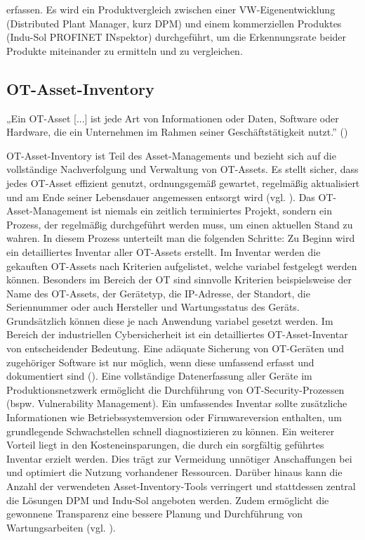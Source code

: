 erfassen. Es wird ein Produktvergleich zwischen einer VW-Eigenentwicklung (Distributed Plant Manager, kurz DPM) und einem kommerziellen Produktes (Indu-Sol PROFINET INspektor) durchgeführt, um die Erkennungsrate beider Produkte miteinander zu ermitteln und zu vergleichen. 



\subsection{OT-Asset-Inventory}

  „Ein OT-Asset [...] ist jede Art von Informationen oder Daten, Software oder Hardware, die ein Unternehmen im Rahmen seiner Geschäftstätigkeit nutzt.'' (\cite{IBM})

OT-Asset-Inventory ist Teil des Asset-Managements und bezieht sich auf die vollständige Nachverfolgung und Verwaltung von OT-Assets. Es stellt sicher, dass jedes OT-Asset effizient genutzt, ordnungsgemäß gewartet, regelmäßig aktualisiert und am Ende seiner Lebensdauer angemessen entsorgt wird (vgl. \cite{IBM}). Das OT-Asset-Management ist niemals ein zeitlich terminiertes Projekt, sondern ein Prozess, der regelmäßig durchgeführt werden muss, um einen aktuellen Stand zu wahren. In diesem Prozess unterteilt man die folgenden Schritte: Zu Beginn wird ein detailliertes Inventar aller OT-Assets erstellt. Im Inventar werden die gekauften OT-Assets nach Kriterien aufgelistet, welche variabel festgelegt werden können. Besonders im Bereich der OT sind sinnvolle Kriterien beispielsweise der Name des OT-Assets, der Gerätetyp, die IP-Adresse, der Standort, die Seriennummer oder auch Hersteller und Wartungsstatus des Geräts. Grundsätzlich können diese je nach Anwendung variabel gesetzt werden. Im Bereich der industriellen Cybersicherheit ist ein detailliertes OT-Asset-Inventar von entscheidender Bedeutung. Eine adäquate Sicherung von OT-Geräten und zugehöriger Software ist nur möglich, wenn diese umfassend erfasst und dokumentiert sind (\cite{atlassian}). Eine vollständige Datenerfassung aller Geräte im Produktionsnetzwerk ermöglicht die Durchführung von OT-Security-Prozessen (bspw. Vulnerability Management). Ein umfassendes Inventar sollte zusätzliche Informationen wie  Betriebssystemversion oder Firmwareversion enthalten, um grundlegende Schwachstellen schnell diagnostizieren zu können. Ein weiterer Vorteil liegt in den Kosteneinsparungen, die durch ein sorgfältig geführtes Inventar erzielt werden. Dies trägt zur Vermeidung unnötiger Anschaffungen bei und optimiert die Nutzung vorhandener Ressourcen. Darüber hinaus kann die Anzahl der verwendeten Asset-Inventory-Tools verringert und stattdessen zentral die Lösungen DPM und Indu-Sol angeboten werden. Zudem ermöglicht die gewonnene Transparenz eine bessere Planung und Durchführung von Wartungsarbeiten (vgl. \cite{sichereIndustrie}).
\clearpage


